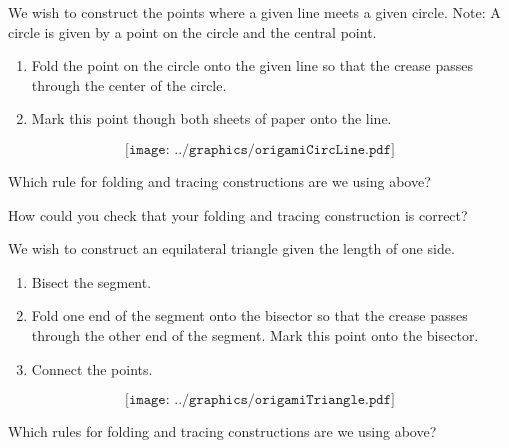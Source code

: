 \begin{construction}
 We wish to
construct the points where a given line meets a given circle. Note: A
circle is given by a point on the circle and the central point.
\begin{enumerate} 
\item Fold the point on the circle onto the given line so that the
  crease passes through the center of the circle.
\item Mark this point though both sheets of paper onto the line.
\end{enumerate}
\[
\texttt{[image: ../graphics/origamiCircLine.pdf]}
\]
\end{construction}

\begin{question} Which rule for folding and tracing constructions are we using above?
\end{question}
\QM

\begin{question} How could you check that your folding and tracing construction is correct?
\end{question}
\QM

\begin{construction} 
We wish to construct an equilateral triangle given the length of one
side.
\begin{enumerate} 
\item Bisect the segment.
\item Fold one end of the segment onto the bisector so that the crease
  passes through the other end of the segment. Mark this point onto
  the bisector.
\item Connect the points.
\end{enumerate}
\[
\texttt{[image: ../graphics/origamiTriangle.pdf]}
\]
\end{construction}

\begin{question} Which rules for folding and tracing constructions are we using above?
\end{question}
\QM







